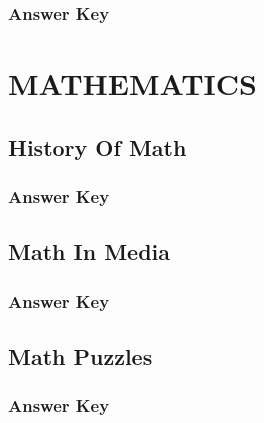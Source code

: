 \documentclass[12pt,a4paper]{book}
\newcounter{totalcounter}
\begin{document}
\subsection*{Answer Key}



\chapter{MATHEMATICS}

\setcounter{totalcounter}{1}

\section{History Of Math}



\subsection*{Answer Key}



\setcounter{totalcounter}{1}

\section{Math In Media}



\subsection*{Answer Key}



\setcounter{totalcounter}{1}

\section{Math Puzzles}



\subsection*{Answer Key}


\end{document}
